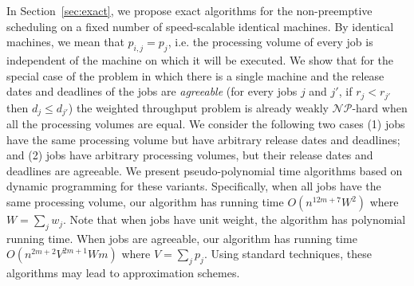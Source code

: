 \documentclass[11pt,a4paper]{article}
\begin{document}
 
In Section~\ref{sec:exact}, we propose exact algorithms for the non-preemptive scheduling on 
a fixed number of speed-scalable identical machines. By identical machines, we mean that $p_{i,j}=p_j$, 
i.e. the processing volume of every job is independent of the machine on which it will be executed.
We show that for the special case of the problem in which there is a single machine 
and the release dates and deadlines of the jobs are \emph{agreeable} (for every jobs $j$ and $j'$, if $r_{j} < r_{j'}$ then $d_{j} \leq d_{j'}$) the weighted throughput problem is already weakly 
$\mathcal{NP}$-hard when all the processing volumes are equal. 
We consider the following two cases
 (1) jobs have the same 
processing volume but have arbitrary release dates and deadlines; 
and (2) jobs have arbitrary processing volumes, but their release dates and deadlines are agreeable. We present pseudo-polynomial time algorithms 
based on dynamic programming for these variants. Specifically, when all jobs have the same 
processing volume, our algorithm has running time $O(n^{12m+7}W^2)$ where $W = \sum_{j} w_{j}$.  
Note that when jobs have unit weight, the algorithm has polynomial running time.
When jobs are agreeable, our algorithm has running time ${O(n^{2m+2}V^{2m+1} Wm)}$
where $V = \sum_{j} p_{j}$. Using standard techniques, these algorithms may lead to 
approximation schemes. 
\end{document}
